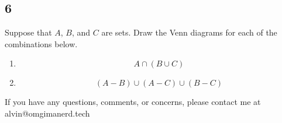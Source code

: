 \documentclass[letterpaper, 12pt]{math}
\begin{document}
\subsection*{6}
Suppose that \( A \), \( B \), and \( C \) are sets. Draw the Venn diagrams
for each of the combinations below.
\begin{enumerate}
  \item
  \[ A \cap (B \cup C) \]
  \begin{center}
    \def\firstcircle{(90:1.75cm) circle (2.5cm)}
    \def\secondcircle{(210:1.75cm) circle (2.5cm)}
    \def\thirdcircle{(330:1.75cm) circle (2.5cm)}
  \end{center}
  \item
  \[ (A-B) \cup (A-C) \cup (B-C) \]
  \begin{center}
    \def\firstcircle{(90:1.75cm) circle (2.5cm)}
    \def\secondcircle{(210:1.75cm) circle (2.5cm)}
    \def\thirdcircle{(330:1.75cm) circle (2.5cm)}
  \end{center}
\end{enumerate}

\begin{center}
  If you have any questions, comments, or concerns, please contact me at
  alvin@omgimanerd.tech
\end{center}
\end{document}

